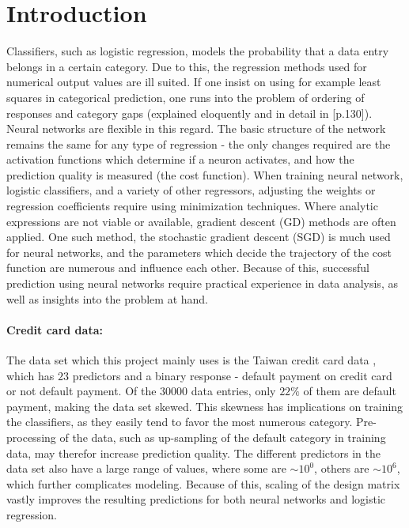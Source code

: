 \documentclass[%
oneside,                 %
final,                   %
10pt]{article}
\begin{document}
\newpage

\section{Introduction}
Classifiers, such as logistic regression, models the probability that a data entry belongs in a certain category. Due to this, the regression methods used for numerical output values are ill suited. If one insist on using for example least squares in categorical prediction, one runs into the problem of ordering of responses and category gaps (explained eloquently and in detail in \citep{2017introstatlearn}[p.130]). Neural networks are flexible in this regard. The basic structure of the network remains the same for any type of regression - the only changes required are the activation functions which determine if a neuron activates, and how the prediction quality is measured (the cost function). When training neural network, logistic classifiers, and a variety of other regressors, adjusting the weights or regression coefficients require using minimization techniques. Where analytic expressions are not viable or available, gradient descent (GD) methods are often applied. One such method, the stochastic gradient descent (SGD) is much used for neural networks, and the parameters which decide the trajectory of the cost function are numerous and influence each other. Because of this, successful prediction using neural networks require practical experience in data analysis, as well as insights into the problem at hand.
 
\paragraph{Credit card data:}
The data set which this project mainly uses is the Taiwan credit card data \cite{YCCC}, which has $23$ predictors and a binary response -  default payment on credit card or not default payment. Of the $30000$ data entries, only $22\%$ of them are default payment, making the data set skewed. This skewness has implications on training the classifiers, as they easily tend to favor the most numerous category. Pre-processing of the data, such as up-sampling of the default category in training data, may therefor increase prediction quality. The different predictors in the data set also have a large range of values, where some are $\sim 10^0$, others are $\sim 10^6$, which further complicates modeling. Because of this, scaling of the design matrix vastly improves the resulting predictions for both neural networks and logistic regression. 
\end{document}
